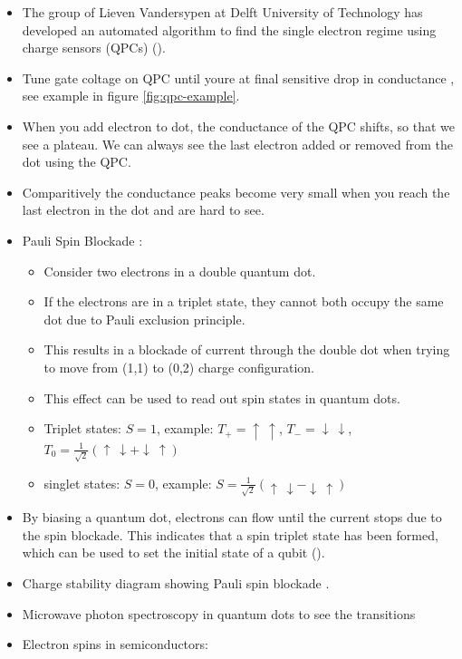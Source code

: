 \begin{itemize}
    \item The group of Lieven Vandersypen at Delft University of Technology has developed an automated algorithm to find the single electron regime using charge sensors (QPCs) ().
    \item Tune gate coltage on QPC until youre at final sensitive drop in conductance \parencite{Field1993}, see example in figure \ref{fig:qpc-example}.
    \item When you add electron to dot, the conductance of the QPC shifts, so that we see a plateau. We can always see the last electron added or removed from the dot using the QPC.
    \item Comparitively the conductance peaks become very small when you reach the last electron in the dot and are hard to see.
    \item Pauli Spin Blockade \parencite{Ono2002}:
          \begin{itemize}
              \item Consider two electrons in a double quantum dot.
              \item If the electrons are in a triplet state, they cannot both occupy the same dot due to Pauli exclusion principle.
              \item This results in a blockade of current through the double dot when trying to move from (1,1) to (0,2) charge configuration.
              \item This effect can be used to read out spin states in quantum dots.
              \item Triplet states: $S = 1$, example: $T_+ = \uparrow\ \uparrow$, $T_- = \downarrow\ \downarrow$, $T_0 = \frac{1}{\sqrt{2}}(\uparrow\ \downarrow + \downarrow\ \uparrow)$
              \item singlet states: $S = 0$, example: $S = \frac{1}{\sqrt{2}}(\uparrow\ \downarrow - \downarrow\ \uparrow)$
          \end{itemize}
    \item By biasing a quantum dot, electrons can flow until the current stops due to the spin blockade. This indicates that a spin triplet state has been formed, which can be used to set the initial state of a qubit ().
    \item Charge stability diagram showing Pauli spin blockade \parencite{NadjPerge2010}.
    \item Microwave photon spectroscopy in quantum dots to see the transitions \parencite{Schreiber2011}
    \item Electron spins in semiconductors:

\end{itemize}
